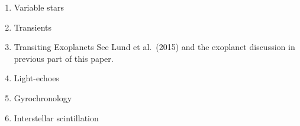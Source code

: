 \begin{enumerate}
  
\item Variable stars


  
  
\item Transients
  
\item Transiting Exoplanets
See Lund et al.\ (2015) and the exoplanet discussion in previous part of this paper.
  

\item Light-echoes
  
\item Gyrochronology
  
\item Interstellar scintillation


\end{enumerate}
